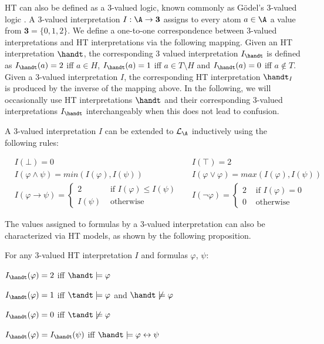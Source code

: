 HT can also be defined as a 3-valued logic, known commonly as Gödel's
3-valued logic \cite{capeva05a}. A 3-valued interpretation
$I: \A \rightarrow \textbf{3}$ assigns to every atom $a\in \A$ a value
from $\textbf{3}=\{ 0, 1, 2 \}$. We define a one-to-one correspondence
between 3-valued interpretations and HT interpretations via the
following mapping. Given an HT interpretation $\handt$, the
corresponding 3 valued interpretation $I_{\handt}$ is defined as
$I_{\handt}(a)=2$ iff $a \in H$, $I_{\handt}(a)=1$ iff
$a \in T \setminus H$ and $I_{\handt}(a)=0$ iff $a \not\in T$. Given a
3-valued interpretation $I$, the corresponding HT interpretation
$\handt_{I}$ is produced by the inverse of the mapping above. In the
following, we will occasionally use HT interpretations $\handt$ and
their corresponding 3-valued interpretations $I_{\handt}$
interchangeably when this does not lead to confusion.

A 3-valued interpretation $I$ can be extended to $\mathcal{L}_\A$
inductively using the following rules:
\begin{definition}\label{def:3-valued-extension}
  \begin{align*}
    &I(\bot) = 0
    &&I(\top) = 2 \\
    &I(\varphi \wedge \psi) = min(I(\varphi),I(\psi)) 
    &&I(\varphi \vee \varphi) = max(I(\varphi),I(\psi)) \\
    &I(\varphi \rightarrow \psi) = 
      \begin{cases}
        2 & \text { if } I(\varphi) \leq I(\psi) \\
        I(\psi) & \text { otherwise }
      \end{cases}
    &&I(\neg \varphi) = \begin{cases}2 
      & \text { if } I(\varphi)=0 \\ 
      0 & \text { otherwise }\end{cases}
  \end{align*}
\end{definition}

The values assigned to formulas by a 3-valued interpretation can also
be characterized via HT models, as shown by the following proposition.

\begin{proposition}\label{prop:3-valued-ht}
For any 3-valued HT interpretation $I$ and formulas $\varphi$, $\psi$:
\begin{description}
  \item $I_{\handt}(\varphi) = 2$ iff $\handt \models \varphi$ 
  \item $I_{\handt}(\varphi) = 1$ iff $\tandt \models \varphi$ and $\handt \not\models \varphi$
  \item $I_{\handt}(\varphi) = 0$ iff $\tandt \not\models \varphi$
  \item  $I_{\handt}(\varphi) = I_{\handt}(\psi)$ iff $\handt \models \varphi \leftrightarrow \psi$
\end{description}
\end{proposition}

